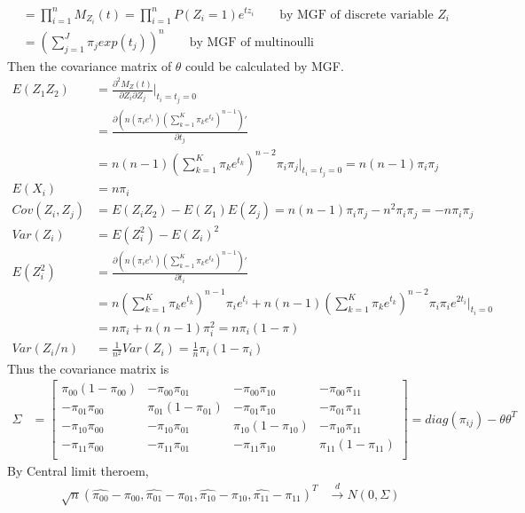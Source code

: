 \begin{itemize}
\begin{align*}
		&= \prod_{i=1}^n M_{Z_i}(t) = \prod_{i=1}^n P(Z_i= 1) e^{tz_i}\qquad  \text{by MGF of discrete variable $Z_i$}\\
		&= \left( \sum_{j=1}^J \pi_j exp(t_j)\right)^n \qquad \text{by MGF of multinoulli}
	\end{align*}  
	Then the covariance matrix of $\theta$ could be calculated by MGF.
	\begin{align*}
		E(Z_1 Z_2) &= \frac{\partial^2 M_Z(t)}{\partial Z_i \partial Z_j}|_{t_i = t_j = 0}\\
		&= \frac{\partial \left(n(\pi_ie^{t_i})(\sum_{k=1}^K \pi_ke^{t_k})^{n-1} \right)'}{\partial t_j}\\
		&= n(n-1)(\sum_{k=1}^K \pi_ke^{t_k})^{n-2}\pi_i\pi_j|_{t_i = t_j = 0} = n(n-1)\pi_i\pi_j\\
		E(X_i) &= n\pi_i\\
		Cov(Z_i, Z_j) &= E(Z_i Z_2) - E(Z_1)E(Z_j) = n(n-1)\pi_i\pi_j - n^2 \pi_i\pi_j = -n\pi_i\pi_j\\
		Var(Z_i) &= E(Z_i^2) - E(Z_i)^2 \\
		E(Z_i^2) &=  \frac{\partial \left(n(\pi_ie^{t_i})(\sum_{k=1}^K \pi_ke^{t_k})^{n-1} \right)'}{\partial t_i}\\
		&= n(\sum_{k=1}^K \pi_ke^{t_k})^{n-1}\pi_i e^{t_i}+ n(n-1)(\sum_{k=1}^K \pi_ke^{t_k})^{n-2}\pi_i\pi_i e^{2t_i}|_{t_i = 0} \\
		&= n\pi_i + n(n-1)\pi_i^2 = n\pi_i(1-\pi)\\
		Var(Z_i/n) &= \frac{1}{n^2} Var(Z_i) = \frac{1}{n}\pi_i(1-\pi_i)
	\end{align*}
	Thus the covariance matrix is
	\begin{align*}
		\Sigma &= \begin{bmatrix}
			\pi_{00}(1-\pi_{00}) &  -\pi_{00}\pi_{01}&  -\pi_{00}\pi_{10} &  -\pi_{00}\pi_{11}\\
			-\pi_{01}\pi_{00} & \pi_{01}(1-\pi_{01}) & -\pi_{01}\pi_{10}   & -\pi_{01}\pi_{11}  \\
			-\pi_{10}\pi_{00} & -\pi_{10}\pi_{01} &  \pi_{10}(1-\pi_{10})  & -\pi_{10}\pi_{11}  \\
			-\pi_{11}\pi_{00} &  -\pi_{11}\pi_{01} & -\pi_{11}\pi_{10}   & \pi_{11}(1-\pi_{11})  \\
		\end{bmatrix}= diag{(\pi_{ij}) - \theta \theta^T}
	\end{align*}
	By Central limit theroem, 
	\begin{align*}
		\sqrt{n} (\hat{\pi_{00}} - \pi_{00}, \hat{\pi_{01}}- \pi_{01}, \hat{\pi_{10}} - \pi_{10}, \hat{\pi_{11}}- \pi_{11} )^T & \xrightarrow[]{d} N(0, \Sigma)

\end{align*}
\end{itemize}
